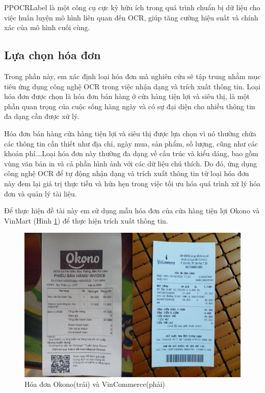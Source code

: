 PPOCRLabel là một công cụ cực kỳ hữu ích trong quá trình chuẩn bị dữ liệu cho việc huấn luyện mô hình liên quan đến OCR, giúp tăng cường hiệu suất và chính xác của mô hình cuối cùng.

\subsection{Lựa chọn hóa đơn}
Trong phần này, em xác định loại hóa đơn mà nghiên cứu sẽ tập trung nhằm mục tiêu ứng dụng công nghệ OCR trong việc nhận dạng và trích xuất thông tin. Loại hóa đơn được chọn là hóa đơn bán hàng ở cửa hàng tiện lợi và siêu thị, là một phần quan trọng của cuộc sống hàng ngày và có sự đại diện cho nhiều thông tin đa dạng cần được xử lý.

Hóa đơn bán hàng cửa hàng tiện lợi và siêu thị được lựa chọn vì nó thường chứa các thông tin cần thiết như địa chỉ, ngày mua, sản phẩm, số lượng, cũng như các khoản phí.\ldots Loại hóa đơn này thường đa dạng về cấu trúc và kiểu dáng, bao gồm vùng văn bản in và cả phần hình ảnh với các dữ liệu chú thích. Do đó, ứng dụng công nghệ OCR để tự động nhận dạng và trích xuất thông tin từ loại hóa đơn này đem lại giá trị thực tiễn và hứa hẹn trong việc tối ưu hóa quá trình xử lý hóa đơn và quản lý tài liệu.

Để thực hiện đề tài này em sử dụng mẫu hóa đơn của cửa hàng tiện lợi Okono và VinMart (Hình \ref{fig9-okono-vincom}) để thực hiện trích xuất thông tin.

\begin{figure}
    \includegraphics[scale=0.28]{images/okono-vincom.png}
    \centering
    \caption{Hóa đơn Okono(trái) và VinCommerce(phải)}
    \label{fig9-okono-vincom}
\end{figure}

